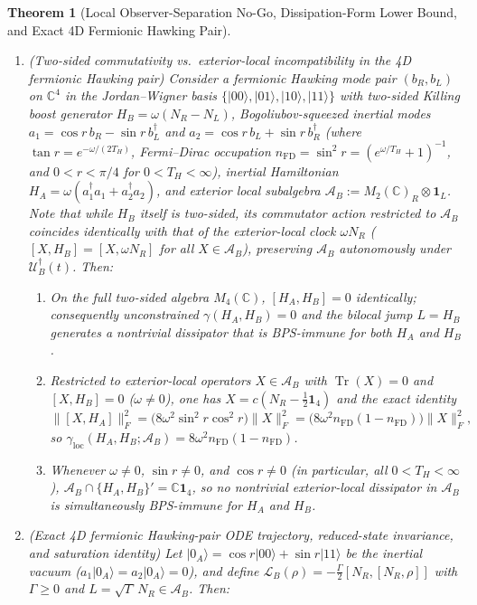 \documentclass[11pt,a4paper]{article}
\newtheorem{theorem}{Theorem}
\theoremstyle{definition}
\theoremstyle{remark}
\newcommand{\Tr}{\operatorname{Tr}}
\newcommand{\cA}{\mathcal{A}}
\newcommand{\cL}{\mathcal{L}}
\newcommand{\cU}{\mathcal{U}}
\newcommand{\bbC}{\mathbb{C}}
\newcommand{\1}{\mathbf{1}}
\newcommand{\normF}[1]{\|#1\|_F}
\begin{document}
\begin{theorem}[Local Observer-Separation No-Go, Dissipation-Form Lower Bound, and Exact 4D Fermionic Hawking Pair]
\begin{enumerate}
  \item[(e)] \emph{(Two-sided commutativity vs.\ exterior-local incompatibility in the 4D fermionic Hawking pair)} Consider a fermionic Hawking mode pair $(b_R, b_L)$ on $\bbC^4$ in the Jordan--Wigner basis $\{|00\rangle,|01\rangle,|10\rangle,|11\rangle\}$ with two-sided Killing boost generator $H_B = \omega(N_R - N_L)$, Bogoliubov-squeezed inertial modes $a_1 = \cos r\,b_R - \sin r\,b_L^\dagger$ and $a_2 = \cos r\,b_L + \sin r\,b_R^\dagger$ (where $\tan r = e^{-\omega/(2T_H)}$, Fermi--Dirac occupation $n_{\mathrm{FD}} = \sin^2 r = (e^{\omega/T_H}+1)^{-1}$, and $0 < r < \pi/4$ for $0 < T_H < \infty$), inertial Hamiltonian $H_A = \omega(a_1^\dagger a_1 + a_2^\dagger a_2)$, and exterior local subalgebra $\cA_B := M_2(\bbC)_R \otimes \1_L$. Note that while $H_B$ itself is two-sided, its commutator action restricted to $\cA_B$ coincides identically with that of the exterior-local clock $\omega N_R$ ($[X, H_B] = [X, \omega N_R]$ for all $X\in\cA_B$), preserving $\cA_B$ autonomously under $\cU_B^\dagger(t)$. Then:
  \begin{enumerate}
    \item[(i)] On the full two-sided algebra $M_4(\bbC)$, $[H_A, H_B] = 0$ identically; consequently unconstrained $\gamma(H_A,H_B) = 0$ and the bilocal jump $L = H_B$ generates a nontrivial dissipator that is BPS-immune for both $H_A$ and $H_B$.
    \item[(ii)] Restricted to exterior-local operators $X \in \cA_B$ with $\Tr(X) = 0$ and $[X, H_B] = 0$ ($\omega \neq 0$), one has $X = c(N_R - \frac{1}{2}\1_4)$ and the exact identity
    \begin{equation}\label{eq:gamma-loc-ferm}
      \normF{[X, H_A]}^2 = \bigl(8\omega^2\sin^2 r\cos^2 r\bigr)\normF{X}^2 = \bigl(8\omega^2 n_{\mathrm{FD}}(1-n_{\mathrm{FD}})\bigr)\normF{X}^2,
    \end{equation}
    so $\gamma_{\mathrm{loc}}(H_A, H_B; \cA_B) = 8\omega^2 n_{\mathrm{FD}}(1-n_{\mathrm{FD}})$.
    \item[(iii)] Whenever $\omega \neq 0$, $\sin r \neq 0$, and $\cos r \neq 0$ (in particular, all $0 < T_H < \infty$), $\cA_B \cap \{H_A, H_B\}' = \bbC\1_4$, so no nontrivial exterior-local dissipator in $\cA_B$ is simultaneously BPS-immune for $H_A$ and $H_B$.
  \end{enumerate}
  \item[(f)] \emph{(Exact 4D fermionic Hawking-pair ODE trajectory, reduced-state invariance, and saturation identity)} Let $|0_A\rangle = \cos r|00\rangle + \sin r|11\rangle$ be the inertial vacuum ($a_1|0_A\rangle = a_2|0_A\rangle = 0$), and define $\cL_B(\rho) = \allowbreak -\frac{\Gamma}{2}[N_R,[N_R,\rho]]$ with $\Gamma \ge 0$ and $L = \sqrt{\Gamma}\,N_R \in \cA_B$. Then:

\end{enumerate}
\end{theorem}
\end{document}

